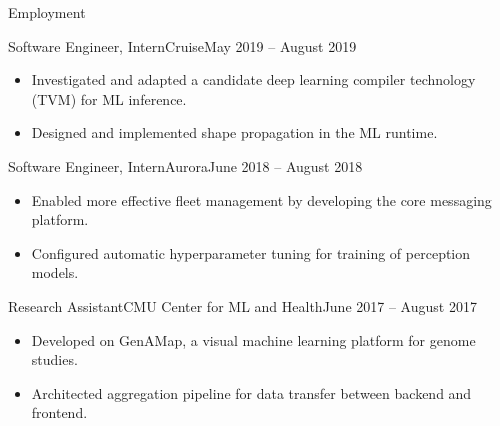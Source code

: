 \documentclass[termes]{resume}
\begin{document}
\begin{cvsection}{Employment}
		\begin{cvsubsection}{Software Engineer, Intern}{Cruise}{May 2019 -- August 2019}	
			\begin{itemize}
				\item Investigated and adapted a candidate deep learning compiler technology (TVM) for ML inference.
				\item Designed and implemented shape propagation in the ML runtime.
			\end{itemize}
		\end{cvsubsection}
		
		\begin{cvsubsection}{Software Engineer, Intern}{Aurora}{June 2018 -- August 2018}	
			\begin{itemize}
				\item Enabled more effective fleet management by developing the core messaging platform.
				\item Configured automatic hyperparameter tuning for training of perception models.
			\end{itemize}
		\end{cvsubsection}
		
		\begin{cvsubsection}{Research Assistant}{CMU Center for ML and Health}{June 2017 -- August 2017}
			\begin{itemize}
				\item Developed on GenAMap, a visual machine learning platform for genome studies.
				\item Architected aggregation pipeline for data transfer between backend and frontend.
			\end{itemize}
		\end{cvsubsection}
	\end{cvsection}
	
\end{document}
